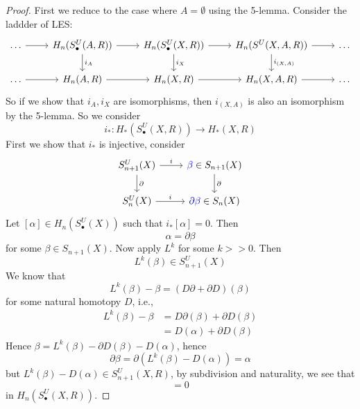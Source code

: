 \begin{proof}
    First we reduce to the case where $A=\emptyset$ using the 5-lemma. Consider the laddder of LES:
    \[\begin{tikzcd}
        \dots & {H_n(S_\bullet^U(A,R))} & {H_n(S_\bullet^U(X,R))} & {H_n(S^U(X,A,R))} & \dots \\
        \dots & {H_n(A,R)} & {H_n(X,R)} & {H_n(X,A,R)} & \dots
        \arrow[from=1-1, to=1-2]
        \arrow[from=1-2, to=1-3]
        \arrow["{i_A}", from=1-2, to=2-2]
        \arrow[from=1-3, to=1-4]
        \arrow["{i_X}", from=1-3, to=2-3]
        \arrow[from=1-4, to=1-5]
        \arrow["{i_{(X,A)}}", from=1-4, to=2-4]
        \arrow[from=2-1, to=2-2]
        \arrow[from=2-2, to=2-3]
        \arrow[from=2-3, to=2-4]
        \arrow[from=2-4, to=2-5]
    \end{tikzcd}\]
    So if we show that $i_A, i_X$ are isomorphisms, then $i_{(X,A)}$ is also an isomorphism by the 5-lemma. So we consider 
    \begin{equation*}
        i_*: H_*(S_\bullet^U(X,R))\to H_*(X,R)
    \end{equation*}
    First we show that $i_*$ is injective, consider 
    \[\begin{tikzcd}
        {S_{n+1}^U(X)} & {\textcolor{blue}{\beta}\in S_{n+1}(X)} \\
        {S_n^U(X)} & {\textcolor{blue}{\partial\beta}\in S_n(X)}
        \arrow["i", from=1-1, to=1-2]
        \arrow["\partial", from=1-1, to=2-1]
        \arrow["\partial", from=1-2, to=2-2]
        \arrow["i", from=2-1, to=2-2]
    \end{tikzcd}\]
    Let $[\alpha]\in H_n(S_\bullet^U(X))$ such that $i_*[\alpha]=0$. Then 
    \begin{equation*}
        \alpha=\partial\beta
    \end{equation*}
    for some $\beta\in S_{n+1}(X)$. Now apply $L^k$ for some $k>>0$. Then 
    \begin{equation*}
        L^k(\beta)\in S_{n+1}^U(X)
    \end{equation*}
    We know that 
    \begin{equation*}
        L^k(\beta)-\beta=(D\partial+\partial D)(\beta)
    \end{equation*}
    for some natural homotopy $D$, i.e., 
    \begin{align*}
        L^k(\beta)-\beta&=D\partial(\beta)+\partial D(\beta)\\
        &=D(\alpha)+\partial D(\beta)
    \end{align*}
    Hence $\beta=L^k(\beta)-\partial D(\beta)-D(\alpha)$, hence 
    \begin{equation*}
        \partial\beta=\partial(L^k(\beta)-D(\alpha))=\alpha
    \end{equation*}
    but $L^k(\beta)-D(\alpha)\in S_{n+1}^U(X,R)$, by subdivision and naturality, we see that 
    \begin{equation*}
        [\alpha]=0
    \end{equation*}
    in $H_n(S_\bullet^U(X,R))$. 
    

\end{proof}
